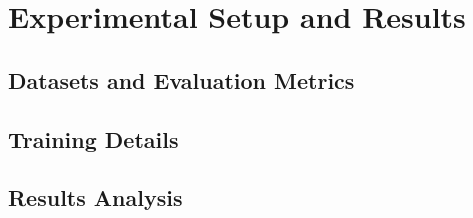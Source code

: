 \section{Experimental Setup and Results}

\subsection{Datasets and Evaluation Metrics}



\subsection{Training Details}



\subsection{Results Analysis}
